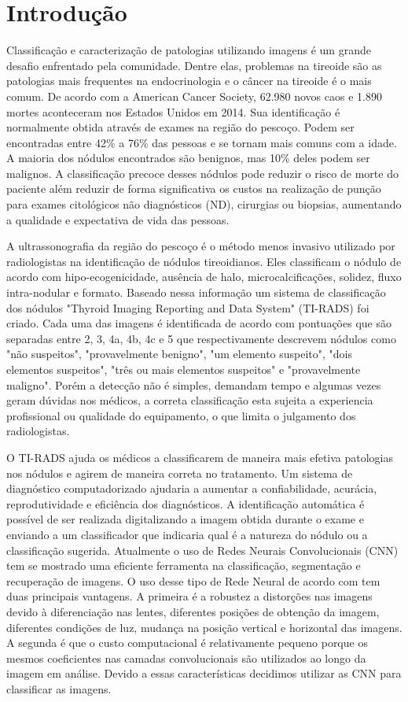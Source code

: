 \documentclass[12pt]{article}
\begin{document}
\section{Introdução}
Classificação e caracterização de patologias utilizando imagens é um grande desafio enfrentado pela comunidade. Dentre elas, problemas na tireoide são as patologias mais frequentes na endocrinologia e o câncer na tireoide é o mais comum\cite{LinaP}. De acordo com a American Cancer Society, 62.980 novos caos e 1.890 mortes aconteceram nos Estados Unidos em 2014. Sua identificação é normalmente obtida através de exames na região do pescoço. Podem ser encontradas entre 42\% a 76\% das pessoas e se tornam mais comuns com a idade\cite{SinghOspinal6670}. A maioria dos nódulos encontrados são benignos, mas 10\% deles podem ser malignos\cite{GuthS}. A classificação precoce desses nódulos pode reduzir o risco de morte do paciente além reduzir de forma significativa os custos na realização de punção para exames citológicos não diagnósticos (ND), cirurgias ou biopsias, aumentando a qualidade e expectativa de vida das pessoas.

A ultrassonografia da região do pescoço é o método menos invasivo utilizado por radiologistas na identificação de nódulos tireoidianos. Eles classificam o nódulo de acordo com hipo-ecogenicidade, ausência de halo, microcalcificações, solidez, fluxo intra-nodular e formato\cite{DianaGaitini}. Baseado nessa informação um sistema de classificação dos nódulos "Thyroid Imaging Reporting and Data System" (TI-RADS) foi criado. Cada uma das imagens é identificada de acordo com pontuações que são separadas entre 2, 3, 4a, 4b, 4c e 5 que respectivamente descrevem nódulos como "não suspeitos", "provavelmente benigno", "um elemento suspeito", "dois elementos suspeitos", "três ou mais elementos suspeitos" e "provavelmente maligno"\cite{KwakJY}. Porém a detecção não é simples, demandam tempo e algumas vezes geram dúvidas nos médicos, a correta classificação esta sujeita a experiencia profissional ou qualidade do equipamento, o que limita o julgamento dos radiologistas\cite{LingamRK}.

O TI-RADS ajuda os médicos a classificarem de maneira mais efetiva patologias nos nódulos e agirem de maneira correta no tratamento. Um sistema de diagnóstico computadorizado ajudaria a aumentar a confiabilidade, acurácia, reprodutividade e eficiência dos diagnósticos. A identificação automática é possível de ser realizada digitalizando a imagem obtida durante o exame e enviando a um classificador que indicaria qual é a natureza do nódulo ou a classificação sugerida. Atualmente o uso de Redes Neurais Convolucionais (CNN) tem se mostrado uma eficiente ferramenta na classificação, segmentação e recuperação de imagens. O uso desse tipo de Rede Neural de acordo com \cite{HijaziS} tem duas principais vantagens. A primeira é a robustez a distorções nas imagens devido à diferenciação nas lentes, diferentes posições de obtenção da imagem, diferentes condições de luz, mudança na posição vertical e horizontal das imagens. A segunda é que o custo computacional é relativamente pequeno porque os mesmos coeficientes nas camadas convolucionais são utilizados ao longo da imagem em análise. Devido a essas características decidimos utilizar as CNN para classificar as imagens.
\end{document}
